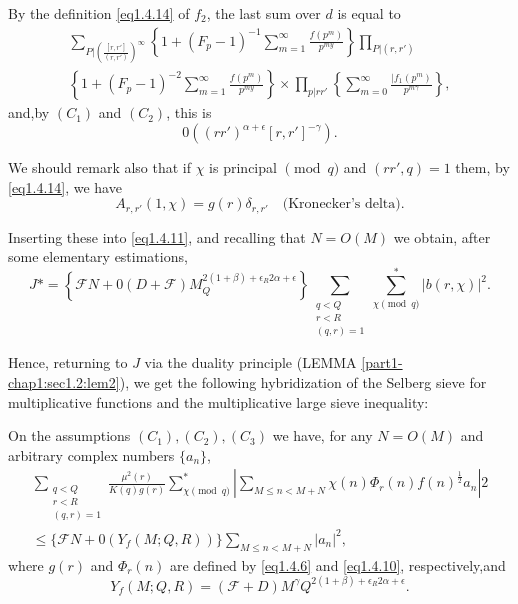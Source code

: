 By the definition \eqref{eq1.4.14} of $f_2$, the last sum over
$d$ is equal to  
\begin{multline*}
  \sum_{P | \left( \frac{[r,r']}{(r,r')}\right)^\infty} \left\{ 1 +
  (F_p-1)^{-1} \sum_{m=1}^{\infty} \frac{f(p^m)}{p^{my}} \right\}  \prod_{P |
  (r,r')}  \\ 
  \left\{ 1 + (F_p-1)^{-2} \sum_{m=1}^{\infty}
  \frac{f(p^m)}{p^{my}} \right\} 
  \times \prod_{p | rr'} \left\{ \sum_{m=0}^{\infty} \frac{| f_1
   (p^m)}{p^{m\gamma}}\right\}, 
\end{multline*}
and,\pageoriginale by $(C_1)$ and $(C_2)$, this is 
$$
0 (( rr')^{\alpha+\epsilon } [r,r']^{-\gamma}).
$$

We should remark also that if $\chi$ is principal $\pmod{q}$ and
$(rr', q) = 1 $ them, by \eqref{eq1.4.14}, we have 
$$
A_{r,r'} (1,\chi) = g(r) \delta_{r,r'}\quad \text{
  (Kronecker's delta)}. 
$$

Inserting these into \eqref{eq1.4.11}, and recalling that $ N = O(M)$ we
obtain, after some elementary estimations, 
$$
J* = \left\{ \mathcal{F} N+0 ( D+ \mathcal{F}) M_{Q}^{2 (1+\beta)
  +\epsilon _R 2\alpha+\epsilon } \right\} \sum_{\substack{q < Q
    \\ r < R \\ (q,r)=1}} \sum_{\chi \pmod{q}}^* | b
(r, \chi) |^2.   
$$

Hence, returning to $J$ via the duality principle (LEMMA
\ref{part1-chap1:sec1.2:lem2}), we get 
the following hybridization of the Selberg sieve for multiplicative
functions and the multiplicative large sieve inequality: 

\begin{theorem}\label{part1-chap1:sec1.4:thm5}%
On the
  assumptions $(C_1),(C_2), (C_3)$ we have, for any $N = O(M)$
and arbitrary complex numbers $\{ a_n\}$, 
 \begin{gather*}
   \sum_{\substack{q < Q\\ r < R \\ (q,r)=1}}  \frac{\mu^2
     (r)}{K(q)g(r)} \sum_{\chi \pmod{q}}^* | \sum_{M \leq n <
     M+N} \chi(n) \Phi_r(n)f(n)^{\frac{1}{2}}a_n | 2\\ 
   \leq \{ \mathcal{F}N + 0 ( Y_f (M;Q,R )) \} \sum_{M \leq n < M+N} | a_n | ^2,
 \end{gather*}
 where $g(r)$ and $\Phi_r (n)$ are defined by \eqref{eq1.4.6}
 and \eqref{eq1.4.10}, respectively,\pageoriginale and  
 $$
 Y_f (M; Q, R) = (\mathcal{F} + D ) M^\gamma Q^{2(1+\beta) +\epsilon _R
  2 \alpha+\epsilon }. 
 $$
\end{theorem}

